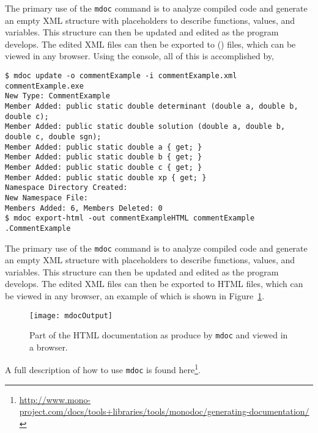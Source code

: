 The primary use of the \lstinline[language=console]{mdoc} command is to analyze compiled code and generate an empty XML structure with placeholders to describe functions, values, and variables. This structure can then be updated and edited as the program develops. The edited XML files can then be exported to  () files, which can be viewed in any browser. Using the console, all of this is accomplished by,
\begin{lstlisting}[language=console]
$ mdoc update -o commentExample -i commentExample.xml commentExample.exe 
New Type: CommentExample
Member Added: public static double determinant (double a, double b, double c);
Member Added: public static double solution (double a, double b, double c, double sgn);
Member Added: public static double a { get; }
Member Added: public static double b { get; }
Member Added: public static double c { get; }
Member Added: public static double xp { get; }
Namespace Directory Created: 
New Namespace File: 
Members Added: 6, Members Deleted: 0
$ mdoc export-html -out commentExampleHTML commentExample
.CommentExample
\end{lstlisting}
The primary use of the \lstinline[language=console]{mdoc} command is to analyze compiled code and generate an empty XML structure with placeholders to describe functions, values, and variables. This structure can then be updated and edited as the program develops. The edited XML files can then be exported to HTML files, which can be viewed in any browser, an example of which is shown in Figure~\ref{fig:htmlDocumentExample}.
\begin{figure}
  \centering
  \texttt{[image: mdocOutput]}
  \caption{Part of the HTML documentation as produce by \lstinline[language=console]{mdoc} and viewed in a browser.}
  \label{fig:htmlDocumentExample}
\end{figure}
A full description of how to use \lstinline[language=console]{mdoc} is found here\footnote{\url{http://www.mono-project.com/docs/tools+libraries/tools/monodoc/generating-documentation/}}.

